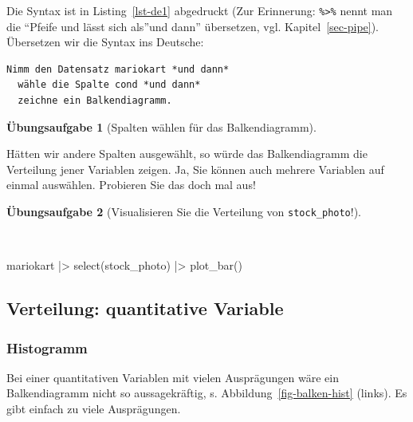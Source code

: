 \documentclass[
  letterpaper,
]{scrbook}
\newenvironment{Shaded}{\begin{snugshade}}{\end{snugshade}}
\newcommand{\FunctionTok}[1]{\textcolor[rgb]{0.28,0.35,0.67}{#1}}
\newcommand{\NormalTok}[1]{\textcolor[rgb]{0.00,0.23,0.31}{#1}}
\newcommand{\SpecialCharTok}[1]{\textcolor[rgb]{0.37,0.37,0.37}{#1}}
\theoremstyle{definition}
\newtheorem{exercise}{Übungsaufgabe}[chapter]
\theoremstyle{definition}
\theoremstyle{definition}
\theoremstyle{remark}
\begin{document}
Die Syntax ist in Listing~\ref{lst-de1} abgedruckt (Zur Erinnerung:
\texttt{\%\textgreater{}\%} nennt man die \enquote{Pfeife und lässt sich
als}und dann'' übersetzen, vgl. Kapitel~\ref{sec-pipe}). Übersetzen wir
die Syntax ins Deutsche:

\begin{verbatim}
Nimm den Datensatz mariokart *und dann*
  wähle die Spalte cond *und dann*
  zeichne ein Balkendiagramm.
\end{verbatim}

\begin{exercise}[Spalten wählen für das
Balkendiagramm]\protect\hypertarget{exr-de1}{}\label{exr-de1}

Hätten wir andere Spalten ausgewählt, so würde das Balkendiagramm die
Verteilung jener Variablen zeigen. Ja, Sie können auch mehrere Variablen
auf einmal auswählen. Probieren Sie das doch mal aus!

\end{exercise}

\begin{exercise}[Visualisieren Sie die Verteilung von
\texttt{stock\_photo}!]\protect\hypertarget{exr-balken}{}\label{exr-balken}

~

\begin{Shaded}
\begin{Highlighting}[]
\NormalTok{mariokart }\SpecialCharTok{|\textgreater{}} 
  \FunctionTok{select}\NormalTok{(stock\_photo) }\SpecialCharTok{|\textgreater{}} 
  \FunctionTok{plot\_bar}\NormalTok{()}
\end{Highlighting}
\end{Shaded}

\end{exercise}

\subsection{Verteilung: quantitative
Variable}\label{verteilung-quantitative-variable}

\subsubsection{Histogramm}\label{histogramm}

Bei einer quantitativen Variablen mit vielen Ausprägungen wäre ein
Balkendiagramm nicht so aussagekräftig, s.
Abbildung~\ref{fig-balken-hist} (links). Es gibt einfach zu viele
Ausprägungen.
\end{document}
